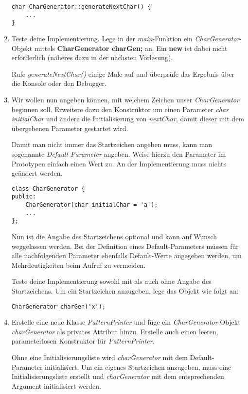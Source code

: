 \begin{enumerate}
\begin{lstlisting}
char CharGenerator::generateNextChar() {
	...
}
\end{lstlisting}

\item
Teste deine Implementierung.
Lege in der \emph{main}-Funktion ein \emph{CharGenerator}-Objekt mittels \textbf{CharGenerator charGen;} an.
Ein \textbf{new} ist dabei nicht erforderlich (näheres dazu in der nächsten Vorlesung).

Rufe \emph{generateNextChar()} einige Male auf und überprüfe das Ergebnis über die Konsole oder den Debugger.

\item
Wir wollen nun angeben können, mit welchem Zeichen unser \emph{CharGenerator} beginnen soll.
Erweitere dazu den Konstruktor um einen Parameter \emph{char initialChar} und ändere die Initialisierung von \emph{nextChar}, damit dieser mit dem übergebenen Parameter gestartet wird.

Damit man nicht immer das Startzeichen angeben muss, kann man sogenannte \emph{Default Parameter} angeben.
Weise hierzu den Parameter im Prototypen einfach einen Wert zu.
An der Implementierung muss nichts geändert werden.
\begin{lstlisting}
class CharGenerator {
public:
	CharGenerator(char initialChar = 'a');
	...
};
\end{lstlisting}

Nun ist die Angabe des Startzeichens optional und kann auf Wunsch weggelassen werden.
Bei der Definition eines Default-Parameters müssen für alle nachfolgenden Parameter ebenfalls Default-Werte angegeben werden, um Mehrdeutigkeiten beim Aufruf zu vermeiden. 

Teste deine Implementierung sowohl mit als auch ohne Angabe des Startzeichens.
Um ein Startzeichen anzugeben, lege das Objekt wie folgt an:
\begin{lstlisting}
CharGenerator charGen('x');
\end{lstlisting}


\item
Erstelle eine neue Klasse \emph{PatternPrinter} und füge ein \emph{CharGenerator}-Objekt \emph{charGenerator} als privates Attribut hinzu.
Erstelle auch einen leeren, parameterlosen Konstruktor für \emph{PatternPrinter}.

Ohne eine Initialisierungsliste wird \emph{charGenerator} mit dem Default-Parameter initialisiert.
Um ein eigenes Startzeichen anzugeben, muss eine Initialisierungsliste erstellt und \emph{charGenerator} mit dem entsprechenden Argument initialisiert werden.


\end{enumerate}
